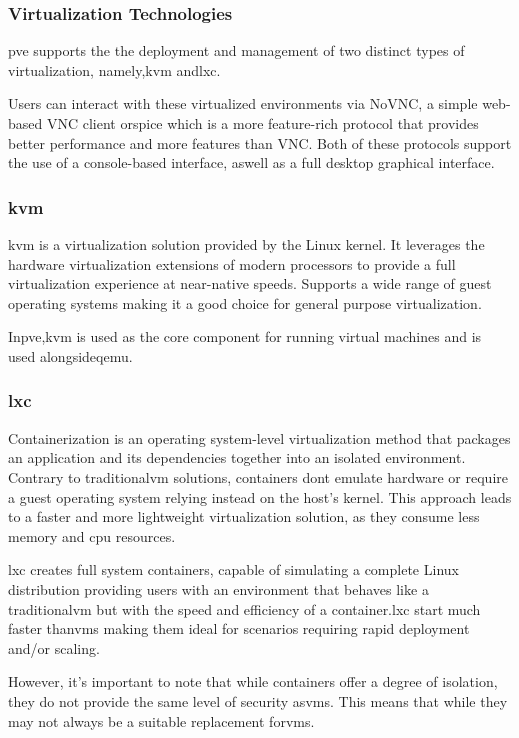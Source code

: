     \subsubsection{Virtualization Technologies}
      \ac{pve} supports the the deployment and management of two distinct types of virtualization, namely,\ac{kvm} and\ac{lxc}.

      Users can interact with these virtualized environments via NoVNC, a simple web-based VNC client or\ac{spice} which is a more
      feature-rich protocol that provides better performance and more features than VNC.
      Both of these protocols support the use of a console-based interface, aswell as a full desktop graphical interface.

      \subsubsection{\ac{kvm}}
        \ac{kvm} is a virtualization solution provided by the Linux kernel. It leverages the hardware virtualization extensions 
        of modern processors to provide a full virtualization experience at near-native speeds. Supports a wide range of guest 
        operating systems making it a good choice for general purpose virtualization.

        In\ac{pve},\ac{kvm} is used as the core component for running virtual machines and is used alongside\ac{qemu}.

      \subsubsection{\ac{lxc}}
        Containerization is an operating system-level virtualization method that packages an application and its dependencies
        together into an isolated environment. Contrary to traditional\ac{vm} solutions, containers dont emulate hardware or require a 
        guest operating system relying instead on the host's kernel. This approach leads to a faster and more lightweight 
        virtualization solution, as they consume less memory and cpu resources.

        \ac{lxc} creates full system containers, capable of simulating a complete Linux distribution providing users with an 
        environment that behaves like a traditional\ac{vm} but with the speed and efficiency of a container.\ac{lxc} start 
        much faster than\ac{vm}s making them ideal for scenarios requiring rapid deployment and/or scaling.

        However, it's important to note that while containers offer a degree of isolation, they do not provide the same level of
        security as\ac{vm}s. This means that while they may not always be a suitable replacement for\ac{vm}s.

